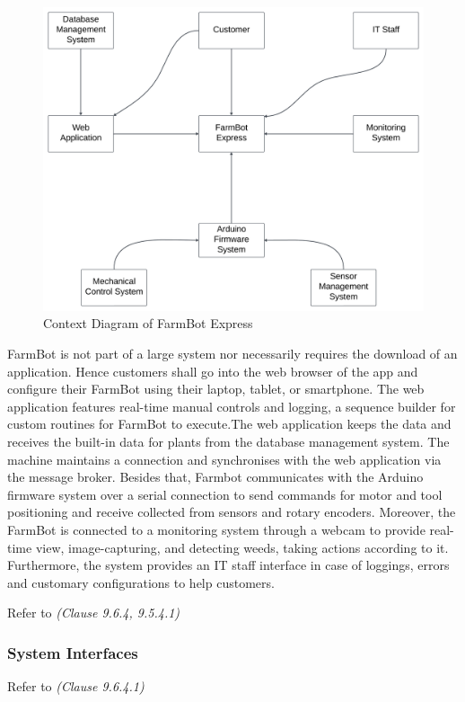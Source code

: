 \begin{figure}[h!]
  \includegraphics[width=\linewidth]{Figures/context-diagram.png}
  \caption{Context Diagram of FarmBot Express}
\end{figure}

\newpage

FarmBot is not part of a large system nor necessarily requires the download of an application. Hence customers shall go into the web browser of the app and configure their FarmBot using their laptop, tablet, or smartphone.
The web application features real-time manual controls and logging, a sequence builder for custom routines for FarmBot to execute.The web application keeps the data and receives the built-in data for plants from the database management system. The machine maintains a connection and synchronises with the web application via the message broker. Besides that, Farmbot communicates with the Arduino firmware system over a serial connection to send commands for motor and tool positioning and receive collected from sensors and rotary encoders. Moreover, the FarmBot is connected to a monitoring system through a webcam to provide real-time view, image-capturing, and detecting weeds, taking actions according to it. Furthermore, the system provides an IT staff interface in case of loggings, errors and customary configurations to help customers.


Refer to \textit{(Clause 9.6.4, 9.5.4.1)}
\subsubsection{System Interfaces}
Refer to \textit{(Clause 9.6.4.1)}
